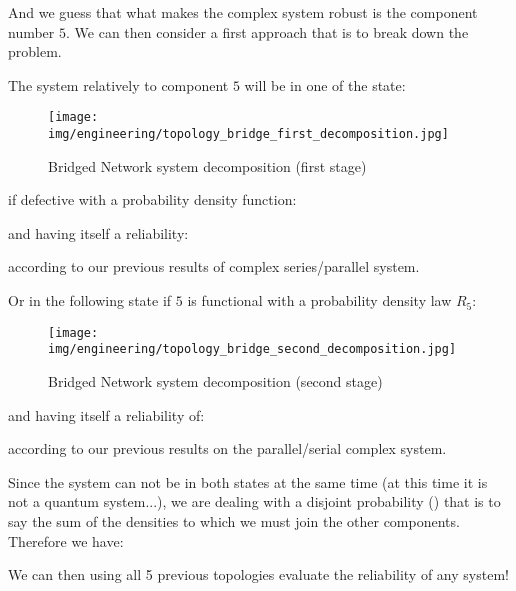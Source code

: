 \begin{enumerate}
		And we guess that what makes the complex system robust is the component number $5$. We can then consider a first approach that is to break down the problem.
		
		The system relatively to component $5$ will be in one of the state:
		\begin{figure}[H]
			\begin{center}
				\texttt{[image: img/engineering/topology\_bridge\_first\_decomposition.jpg]}
			\end{center}	
			\caption[]{Bridged Network system decomposition (first stage)}
		\end{figure}
		if defective with a probability density function:
		
		and having itself a reliability:
		
		according to our previous results of complex series/parallel system.
		
		Or in the following state if $5$ is functional with a probability density law $R_5$:
		\begin{figure}[H]
			\begin{center}
				\texttt{[image: img/engineering/topology\_bridge\_second\_decomposition.jpg]}
			\end{center}	
			\caption[]{Bridged Network system decomposition (second stage)}
		\end{figure}
		and having itself a reliability of:
		
		according to our previous results on the parallel/serial complex system.
		
		Since the system can not be in both states at the same time (at this time it is not a quantum system...), we are dealing with a disjoint probability () that is to say the sum of the densities to which we must join the other components. Therefore we have:
		
	\end{enumerate}
		We can then using all 5 previous topologies evaluate the reliability of any system!
	
